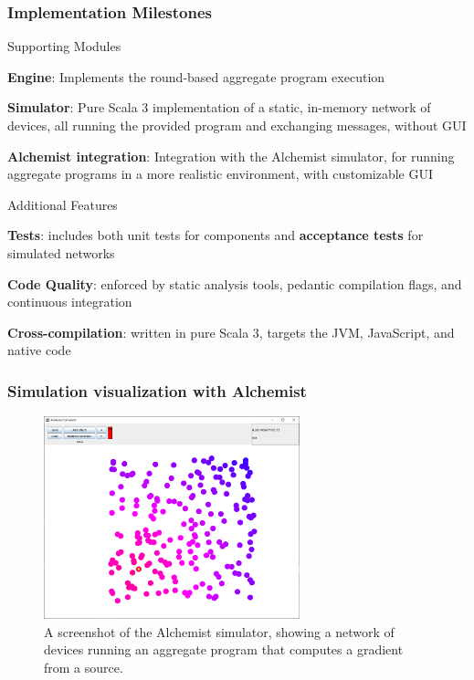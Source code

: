 \begin{frame}
    \frametitle{Implementation Milestones}
    \begin{blockitems}{Supporting Modules}
        \item \textbf{Engine}: Implements the round-based aggregate program execution
        \item \textbf{Simulator}: Pure Scala 3 implementation of a static, in-memory network of devices, all running the provided program and exchanging messages, without \ac{GUI}
        \item \textbf{Alchemist integration}: Integration with the Alchemist simulator, for running aggregate programs in a more realistic environment, with customizable \ac{GUI}
    \end{blockitems}
\end{frame}

\begin{frame}
    \begin{blockitems}{Additional Features}
        \item \textbf{Tests}: includes both unit tests for components and \textbf{acceptance tests} for simulated networks
        \item \textbf{Code Quality}: enforced by static analysis tools, pedantic compilation flags, and continuous integration
        \item \textbf{Cross-compilation}: written in pure Scala 3, \this targets the \ac{JVM}, JavaScript, and native code
    \end{blockitems}
\end{frame}

\begin{frame}
    \frametitle{Simulation visualization with Alchemist}
    \begin{figure}
        \label{fig:alchemist-demo}
        \centering
        \includegraphics[width=0.66\textwidth]{figures/alchemist-demo.png}
        \caption{A screenshot of the Alchemist simulator, showing a network of devices running an aggregate program that computes a gradient from a source.}
    \end{figure}
\end{frame}

